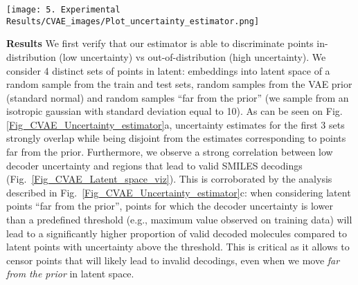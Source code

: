 \begin{figure*}[h]
    \centering
    \texttt{[image: 5. Experimental Results/CVAE\_images/Plot\_uncertainty\_estimator.png]}
    \caption{\textbf{Uncertainty estimator.} a) Distribution of decoder uncertainty values (IS-MI) for 1k samples for 4 distinct sets (train \& test set samples embedded in latent space; samples from the prior; samples far from the prior). b) Valid decodings (\%) as a function of the proportion of samples kept based on their uncertainty --- eliminating points with high uncertainty first (dataset comprised of 50\% samples from test set \& 50\% of samples far from the prior). The IS-MI estimator has superior ability to identify points leading to invalid decodings. c)  Valid decodings (\%) for samples from a normal distribution with increasing standard deviation. Samples with decoder uncertainty below a predefined threshold (maximum IS-MI value observed on training data) have a much higher rate of valid decodings. Points above the threshold are very likely to lead to invalid decodings.}
    \label{Fig_CVAE_Uncertainty_estimator}
\vspace{-2mm}
\end{figure*}

\textbf{Results} We first verify that our estimator is able to discriminate points in-distribution (low uncertainty) vs out-of-distribution (high uncertainty). We consider 4 distinct sets of points in latent: embeddings into latent space of a random sample from the train and test sets, random samples from the VAE prior (standard normal) and random samples ``far from the prior'' (we sample from an isotropic gaussian with standard deviation equal to 10). As can be seen on Fig.\ref{Fig_CVAE_Uncertainty_estimator}a, uncertainty estimates for the first 3 sets strongly overlap while being disjoint from the estimates corresponding to points far from the prior.  Furthermore, we observe a strong correlation between low decoder uncertainty and regions that lead to valid SMILES decodings (Fig.~\ref{Fig_CVAE_Latent_space_viz}). This is corroborated by the analysis described in Fig.~\ref{Fig_CVAE_Uncertainty_estimator}c: when considering latent points ``far from the prior'', points for which the decoder uncertainty is lower than a predefined threshold (e.g., maximum value observed on training data) will lead to a significantly higher proportion of valid decoded molecules compared to latent points with uncertainty above the threshold. This is critical as it allows to censor points that will likely lead to invalid decodings, even when we move \emph{far from the prior} in latent space.


